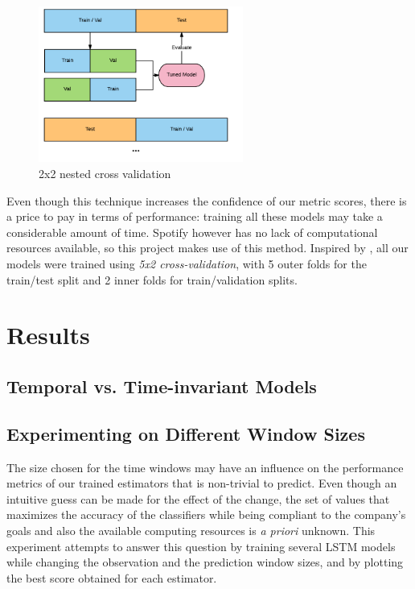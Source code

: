 \documentclass{kththesis}
\begin{document}
	\begin{figure}[h]
    \centering
    \includegraphics[width=0.6\textwidth, natwidth=450bp, natheight=200bp]{figures/nest_crossval.png}
    \caption{2x2 nested cross validation}
    \label{fig:nest_crossval}
	\end{figure}

Even though this technique increases the confidence of our metric scores, there is a price to pay in terms of performance: training all these models may take a considerable amount of time. Spotify however has no lack of computational resources available, so this project makes use of this method. Inspired by \citep{Burez2009}, all our models were trained using \emph{5x2 cross-validation}, with 5 outer folds for the train/test split and 2 inner folds for train/validation splits.

\chapter{Results}

\section{Temporal vs. Time-invariant Models}

\section{Experimenting on Different Window Sizes}

The size chosen for the time windows may have an influence on the performance metrics of our trained estimators that is non-trivial to predict. Even though an intuitive guess can be made for the effect of the change, the set of values that maximizes the accuracy of the classifiers while being compliant to the company's goals and also the available computing resources is \textit{a priori} unknown. This experiment attempts to answer this question by training several LSTM models while changing the observation and the prediction window sizes, and by plotting the best score obtained for each estimator.
\end{document}
